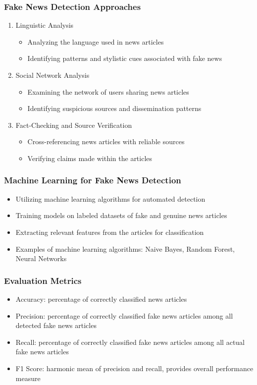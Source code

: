 \documentclass{beamer}
\begin{document}
\begin{frame}
  \frametitle{Fake News Detection Approaches}
  \begin{enumerate}
    \item Linguistic Analysis
    \begin{itemize}
      \item Analyzing the language used in news articles
      \item Identifying patterns and stylistic cues associated with fake news
    \end{itemize}
    \item Social Network Analysis
    \begin{itemize}
      \item Examining the network of users sharing news articles
      \item Identifying suspicious sources and dissemination patterns
    \end{itemize}
    \item Fact-Checking and Source Verification
    \begin{itemize}
      \item Cross-referencing news articles with reliable sources
      \item Verifying claims made within the articles
    \end{itemize}
  \end{enumerate}
\end{frame}

\begin{frame}
  \frametitle{Machine Learning for Fake News Detection}
  \begin{itemize}
    \item Utilizing machine learning algorithms for automated detection
    \item Training models on labeled datasets of fake and genuine news articles
    \item Extracting relevant features from the articles for classification
    \item Examples of machine learning algorithms: Naive Bayes, Random Forest, Neural Networks
  \end{itemize}
\end{frame}

\begin{frame}
  \frametitle{Evaluation Metrics}
  \begin{itemize}
    \item Accuracy: percentage of correctly classified news articles
    \item Precision: percentage of correctly classified fake news articles among all detected fake news articles
    \item Recall: percentage of correctly classified fake news articles among all actual fake news articles
    \item F1 Score: harmonic mean of precision and recall, provides overall performance measure
  \end{itemize}
\end{frame}
\end{document}
